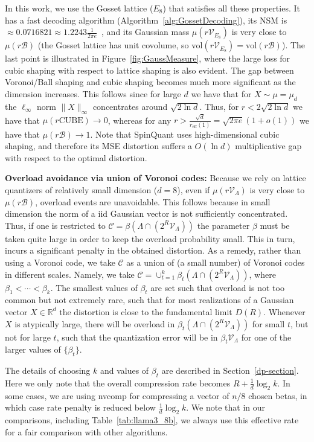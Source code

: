 \documentclass{article}
\newcommand{\RR}{\mathbb{R}}
\newcommand{\m}{\mathcal}
\theoremstyle{plain}
\theoremstyle{definition}
\theoremstyle{remark}
\begin{document}
In this work, we use the Gosset lattice ($E_8$) that satisfies all these properties. It has a fast decoding algorithm (Algorithm~\ref{alg:GossetDecoding}), its NSM is $\approx 0.0716821\approx 1.2243\frac{1}{2\pi e}$~\cite{agrell2023best}, and its Gaussian mass $\mu(r\m{V}_{E_8})$ is very close to $\mu(r \m{B})$ (the Gosset lattice has unit covolume, so $\mathrm{vol}(r\m{V}_{E_8})=\mathrm{vol}(r\m{B})$). The last point is illustrated in Figure~\ref{fig:GaussMeasure}, where the large loss for cubic shaping with respect to lattice shaping is also evident. The gap between Voronoi/Ball shaping and cubic shaping becomes much more significant as the dimension increases. This follows since for large $d$ we have that for $X\sim \mu=\mu_d$ the $\ell_\infty$ norm $\|X\|_{\infty}$ concentrates around $\sqrt{2\ln{d}}$. Thus, for $r<2\sqrt{2\ln{d}}$ we have that $\mu(r\mathrm{CUBE})\to 0$, whereas for any $r>\frac{\sqrt{d}}{r_{\text{eff}}(1)}=\sqrt{2\pi e}(1+o(1))$ we have that $\mu(r\m{B})\to 1$. Note that SpinQuant uses high-dimensional cubic shaping, and therefore its MSE distortion suffers a $O(\ln d)$ multiplicative gap with respect to the optimal distortion.


\textbf{Overload avoidance via union of Voronoi codes:} Because we rely on lattice quantizers of relatively small dimension ($d=8$), even if $\mu(r\m{V}_{\Lambda})$ is very close to $\mu(r\m{B})$, overload events are unavoidable. This follows because in small dimension the norm of a iid Gaussian vector is not sufficiently concentrated. Thus, if one is restricted to $\m{C}=\beta(\Lambda\cap (2^R \m{V}_{\Lambda}))$ the parameter $\beta$ must be taken quite large in order to keep the overload probability small. This in turn, incurs a significant penalty in the obtained distortion. As a remedy, rather than using a Voronoi code, we take $\m{C}$ as a union of (a small number) of Voronoi codes in different scales. Namely, we take $\m{C}=\cup_{t=1}^{k} \beta_t(\Lambda\cap (2^R \m{V}_{\Lambda}))$, where $\beta_1<\cdots<\beta_{k}$. The smallest values of $\beta_t$ are set such that overload is not too common but not extremely rare, such that for most realizations of a Gaussian vector $X\in\RR^d$ the distortion is close to the fundamental limit $D(R)$. Whenever $X$ is atypically large, there will be overload in $\beta_t(\Lambda\cap (2^R \m{V}_{\Lambda}))$ for small $t$, but not for large $t$, such that the quantization error will be in $\beta_t \m{V}_{\Lambda}$ for one of the larger values of $\{\beta_t\}$. 

The details of choosing $k$ and values of $\beta_t$ are described in Section~\ref{dp-section}. Here we only note that the overall compression rate becomes $R+{\frac{1}{d}}{\log_2 k}$. In some cases, we are using nvcomp \cite{nvcomp} for compressing a vector of $n/8$ chosen betas, in which case rate penalty is reduced below ${\frac{1}{d}}\log_2 k$. We note that in our comparisons, including Table~\ref{tab:llama3_8b}, we always use this effective rate for a fair comparison with 
other algorithms.
\end{document}
